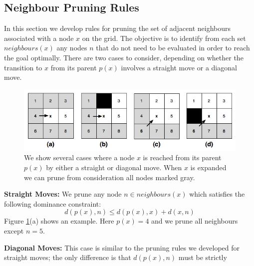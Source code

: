 \subsection{Neighbour Pruning Rules} 
\label{sec:pruning}

In this section we develop rules for pruning the set of adjacent neighbours
associated with a node $x$ on the grid.  The objective is to identify from each
set $neighbours(x)$ any nodes $n$ that do not need to be evaluated in order to
reach the goal optimally.  There are two cases to consider, depending on
whether the transition to $x$ from its parent $p(x)$ involves a straight move or
a diagonal move.

\begin{figure}[tb]
       \begin{center}
		   \includegraphics[scale=0.4, trim = 10mm 10mm 10mm 0mm]{diagrams/pruningrules.png}
       \end{center}
	\vspace{-3pt}
       \caption{We show several cases where a node $x$ is reached from its
parent $p(x)$ by either a straight or diagonal move. When $x$ is expanded we can
prune from consideration all nodes marked gray.}
       \label{fig:pruning}
\end{figure}
\par \noindent
\textbf{Straight Moves:} We prune any node $n \in neighbours(x)$ which satisfies
the following dominance constraint: 
\begin{equation}
d(p(x), n) \leq d(p(x), x) + d(x, n)
\end{equation}
Figure \ref{fig:pruning}(a) shows an example. Here $p(x) = 4$ and we prune
 all neighbours except $n = 5$.
\par \noindent
\textbf{Diagonal Moves:} This case is similar to the pruning rules we developed
for straight moves; the only difference is that $d(p(x), n)$ must be strictly
